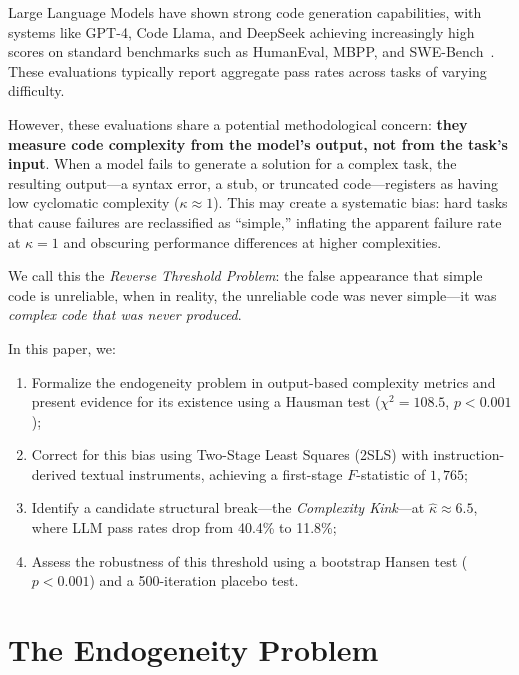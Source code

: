 \documentclass[conference]{IEEEtran}
\begin{document}
Large Language Models have shown strong code generation capabilities, with systems like GPT-4, Code Llama, and DeepSeek achieving increasingly high scores on standard benchmarks such as HumanEval, MBPP, and SWE-Bench~\cite{chen2021evaluating, austin2021program}. These evaluations typically report aggregate pass rates across tasks of varying difficulty.

However, these evaluations share a potential methodological concern: \textbf{they measure code complexity from the model's output, not from the task's input}. When a model fails to generate a solution for a complex task, the resulting output---a syntax error, a stub, or truncated code---registers as having low cyclomatic complexity ($\kappa \approx 1$). This may create a systematic bias: hard tasks that cause failures are reclassified as ``simple,'' inflating the apparent failure rate at $\kappa = 1$ and obscuring performance differences at higher complexities.

We call this the \emph{Reverse Threshold Problem}: the false appearance that simple code is unreliable, when in reality, the unreliable code was never simple---it was \emph{complex code that was never produced}.

In this paper, we:
\begin{enumerate}
    \item Formalize the endogeneity problem in output-based complexity metrics and present evidence for its existence using a Hausman test ($\chi^2 = 108.5$, $p < 0.001$);
    \item Correct for this bias using Two-Stage Least Squares (2SLS) with instruction-derived textual instruments, achieving a first-stage $F$-statistic of $1{,}765$;
    \item Identify a candidate structural break---the \emph{Complexity Kink}---at $\hat{\kappa} \approx 6.5$, where LLM pass rates drop from 40.4\% to 11.8\%;
    \item Assess the robustness of this threshold using a bootstrap Hansen test ($p < 0.001$) and a 500-iteration placebo test.
\end{enumerate}

\section{The Endogeneity Problem}
\label{sec:endogeneity}
\end{document}

